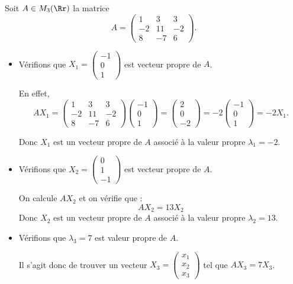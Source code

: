 \documentclass[11pt, class=report,crop=false]{standalone}
\begin{document}
 
\begin{exemple}
Soit $A \in M_3(\Rr)$ la matrice 
$$A = \begin{pmatrix}
1 & 3 & 3 \\
-2 & 11 & -2 \\
8 & -7 & 6
\end{pmatrix}.$$
\begin{itemize}
  \item Vérifions que $X_1 = \begin{pmatrix}-1\\0\\1\end{pmatrix}$ 
  est vecteur propre de $A$.
  
  En effet,
 $$A X_1 = \begin{pmatrix}
1 & 3 & 3 \\
-2 & 11 & -2 \\
8 & -7 & 6
\end{pmatrix} 
\begin{pmatrix}-1\\0\\1\end{pmatrix}
= \begin{pmatrix}2\\0\\-2\end{pmatrix}
= -2 \begin{pmatrix}-1\\0\\1\end{pmatrix}
= -2 X_1.$$

Donc $X_1$ est un vecteur propre de $A$ associé à la valeur propre $\lambda_1 = -2$.

 \item Vérifions que $X_2 = \begin{pmatrix}0\\1\\-1\end{pmatrix}$ 
  est vecteur propre de $A$.
  
  On calcule $AX_2$ et on vérifie que :
  $$AX_2 = 13 X_2$$
  Donc $X_2$ est un vecteur propre de $A$ associé à la valeur propre $\lambda_2 = 13$.

  \item Vérifions que $\lambda_3 = 7$ est valeur propre de $A$.
  
  Il s'agit donc de trouver un vecteur $X_3 = \begin{pmatrix}x_1\\x_2\\x_3\end{pmatrix}$
  tel que $AX_3 = 7 X_3$.
  

\end{itemize}
\end{exemple}
\end{document}
